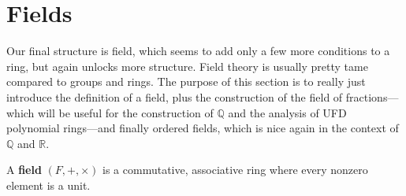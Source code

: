 \section{Fields}  

  Our final structure is field, which seems to add only a few more conditions to a ring, but again unlocks more structure. Field theory is usually pretty tame compared to groups and rings. The purpose of this section is to really just introduce the definition of a field, plus the construction of the field of fractions---which will be useful for the construction of $\mathbb{Q}$ and the analysis of UFD polynomial rings---and finally ordered fields, which is nice again in the context of $\mathbb{Q}$ and $\mathbb{R}$. 
  
  \begin{definition}[Field] 
    \label{def:field}
    A \textbf{field} $(F, +, \times)$ is a commutative, associative ring where every nonzero element is a unit. 
  \end{definition}

